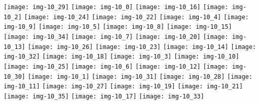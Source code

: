 \documentclass[a4paper]{article}
\begin{document}
	\texttt{[image: img-10\_29]}
	\texttt{[image: img-10\_0]}
	\texttt{[image: img-10\_16]}
	\texttt{[image: img-10\_2]}
	\texttt{[image: img-10\_24]}
	\texttt{[image: img-10\_22]}
	\texttt{[image: img-10\_4]}
	\texttt{[image: img-10\_9]}
	\texttt{[image: img-10\_5]}
	\texttt{[image: img-10\_8]}
	\texttt{[image: img-10\_15]}
	\texttt{[image: img-10\_34]}
	\texttt{[image: img-10\_7]}
	\texttt{[image: img-10\_20]}
	\texttt{[image: img-10\_13]}
	\texttt{[image: img-10\_26]}
	\texttt{[image: img-10\_23]}
	\texttt{[image: img-10\_14]}
	\texttt{[image: img-10\_32]}
	\texttt{[image: img-10\_18]}
	\texttt{[image: img-10\_3]}
	\texttt{[image: img-10\_10]}
	\texttt{[image: img-10\_25]}
	\texttt{[image: img-10\_6]}
	\texttt{[image: img-10\_12]}
	\texttt{[image: img-10\_30]}
	\texttt{[image: img-10\_1]}
	\texttt{[image: img-10\_31]}
	\texttt{[image: img-10\_28]}
	\texttt{[image: img-10\_11]}
	\texttt{[image: img-10\_27]}
	\texttt{[image: img-10\_19]}
	\texttt{[image: img-10\_21]}
	\texttt{[image: img-10\_35]}
	\texttt{[image: img-10\_17]}
	\texttt{[image: img-10\_33]}
\end{document}
